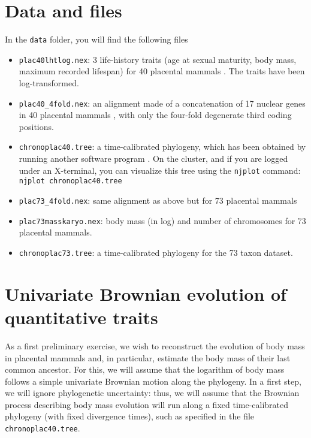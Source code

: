 \documentclass[usletter]{article}
\newcommand{\cmd}[1]{\texttt{#1}}
\begin{document}
\section*{Data and files}

In the \cmd{data} folder, you will find the following files
\begin{itemize}
\item
\cmd{plac40lhtlog.nex}: 3 life-history traits (age at sexual maturity, body mass, maximum recorded lifespan) for 40 placental mammals \citep[taken from the Anage database,][]{deMagalhaes:2009p991}. The traits have been log-transformed.
\item
\cmd{plac40\_4fold.nex}: an alignment made of a concatenation of 17 nuclear genes in 40 placental mammals \citep[from][]{Lartillot:2012be}, with only the four-fold degenerate third coding positions.
\item
\cmd{chronoplac40.tree}: a time-calibrated phylogeny, which has been obtained by running another software program \citep[PhyloBayes,][]{Lartillot:2009p884}.
On the cluster, and if you are logged under an X-terminal, you can visualize this tree using the \cmd{njplot} command:
\\
\cmd{njplot chronoplac40.tree}
\item
\cmd{plac73\_4fold.nex}: same alignment as above but for 73 placental mammals
\item
\cmd{plac73masskaryo.nex}: body mass (in log) and number of chromosomes for 73 placental mammals.
\item
\cmd{chronoplac73.tree}: a time-calibrated phylogeny for the 73 taxon dataset.
\end{itemize}

\section{Univariate Brownian evolution of quantitative traits}

\label{univariate}

As a first preliminary exercise, we wish to reconstruct the evolution of body mass in placental mammals and, in particular, estimate the body mass of their last common ancestor.
For this, we will assume that the logarithm of body mass follows a simple univariate Brownian motion along the phylogeny.
In a first step, we will ignore phylogenetic uncertainty:
thus, we will assume that the Brownian process describing body mass evolution will run along a fixed time-calibrated phylogeny (with fixed divergence times), such as specified in the file \cmd{chronoplac40.tree}.
\end{document}
